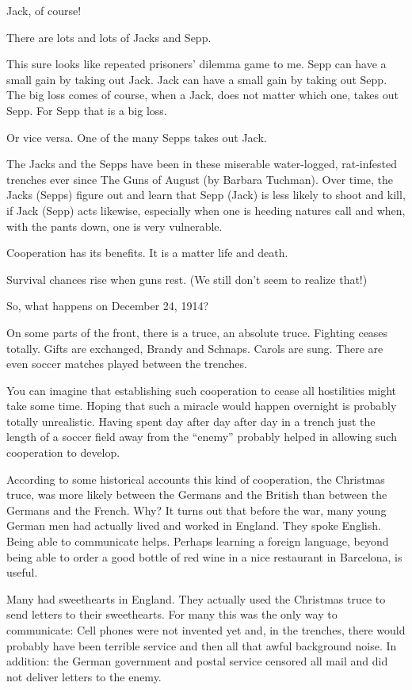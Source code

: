 \documentclass[
]{book}
\begin{document}
\begin{center}
Jack, of course!

\end{center}

There are lots and lots of Jacks and Sepp.

This sure looks like repeated prisoners' dilemma game to me. Sepp can have a small gain by taking out Jack. Jack can have a small gain by taking out Sepp. The big loss comes of course, when a Jack, does not matter which one, takes out Sepp. For Sepp that is a big loss.

Or vice versa. One of the many Sepps takes out Jack.

The Jacks and the Sepps have been in these miserable water-logged, rat-infested trenches ever since The Guns of August (by Barbara Tuchman). Over time, the Jacks (Sepps) figure out and learn that Sepp (Jack) is less likely to shoot and kill, if Jack (Sepp) acts likewise, especially when one is heeding natures call and when, with the pants down, one is very vulnerable.

Cooperation has its benefits. It is a matter life and death.

Survival chances rise when guns rest. (We still don't seem to realize that!)

So, what happens on December 24, 1914?

On some parts of the front, there is a truce, an absolute truce. Fighting ceases totally. Gifts are exchanged, Brandy and Schnaps. Carols are sung. There are even soccer matches played between the trenches.

You can imagine that establishing such cooperation to cease all hostilities might take some time. Hoping that such a miracle would happen overnight is probably totally unrealistic. Having spent day after day after day in a trench just the length of a soccer field away from the ``enemy'' probably helped in allowing such cooperation to develop.

According to some historical accounts this kind of cooperation, the Christmas truce, was more likely between the Germans and the British than between the Germans and the French. Why? It turns out that before the war, many young German men had actually lived and worked in England. They spoke English. Being able to communicate helps. Perhaps learning a foreign language, beyond being able to order a good bottle of red wine in a nice restaurant in Barcelona, is useful.

Many had sweethearts in England. They actually used the Christmas truce to send letters to their sweethearts. For many this was the only way to communicate: Cell phones were not invented yet and, in the trenches, there would probably have been terrible service and then all that awful background noise. In addition: the German government and postal service censored all mail and did not deliver letters to the enemy.
\end{document}
